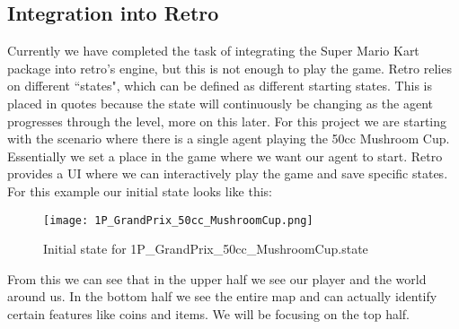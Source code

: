 \documentclass[12pt,letter]{article}
\begin{document}
\subsection{Integration into Retro}
Currently we have completed the task of integrating the Super Mario Kart package
into retro's engine, but this is not enough to play the game. Retro relies on 
different ``states", which can be defined as different starting states. 
This is placed in quotes because the state will continuously be changing as
the agent progresses through the level, more on this later. For
this project we are starting with the scenario where there is a single agent
playing the 50cc Mushroom Cup. Essentially we set a place in the game where we
want our agent to start. Retro provides a UI where we can interactively play
the game and save specific states. For this example our initial state looks like
this:
\begin{figure}[h!]
    \centering
    \texttt{[image: 1P\_GrandPrix\_50cc\_MushroomCup.png]}
    \caption{Initial state for 1P\_GrandPrix\_50cc\_MushroomCup.state}
\end{figure}
\FloatBarrier
From this we can see that in the upper half we see our player and the world
around us. In the bottom half we see the entire map and can actually identify 
certain features like coins and items. We will be focusing on the top half.
\end{document}
